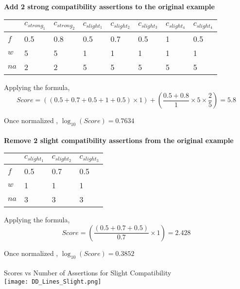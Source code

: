 \documentclass[11pt]{article}
\begin{document}
\begin{large}
\textbf{Add 2 strong compatibility assertions to the original example} \\
\begin{tabular}{|l|l|l|l|l|l|l|l|}
\hline
     & $c_{strong_{1}}$ & $c_{strong_{2}}$ & $c_{slight_{1}}$ & $c_{slight_{2}}$ & $c_{slight_{3}}$ & $c_{slight_{4}}$ & $c_{slight_{4}}$ \\ \hline
$f$  & 0.5              & 0.8              & 0.5              & 0.7              & 0.5              & 1                & 0.5              \\ \hline
$w$  & 5                & 5                & 1                & 1                & 1                & 1                & 1                \\ \hline
$na$ & 2                & 2                & 5                & 5                & 5                & 5                & 5                \\ \hline
\end{tabular}

Applying the formula, \\
$$Score = ((0.5 + 0.7 +0.5 +1 + 0.5) \times 1) + (\frac{0.5+0.8}{1} \times 5 \times \frac{2}{5}) = 5.8 $$

Once normalized , $\log_{10}(Score) =  0.7634$ \\ \\

\textbf{Remove 2 slight compatibility assertions from the original example} \\
\begin{tabular}{|l|l|l|l|}
\hline
     & $c_{slight_{1}}$ & $c_{slight_{2}}$ & $c_{slight_{3}}$ \\ \hline
$f$  & 0.5              & 0.7              & 0.5              \\ \hline
$w$  & 1                & 1                & 1                \\ \hline
$na$ & 3                & 3                & 3                \\ \hline
\end{tabular}

Applying the formula, \\
$$Score = (\frac{(0.5 + 0.7 +0.5)}{0.7} \times 1) = 2.428 $$

Once normalized , $\log_{10}(Score) =  0.3852$ \\ \\

Scores vs Number of Assertions for Slight Compatibility \\
\texttt{[image: DD\_Lines\_Slight.png]}

\end{large}
\end{document}
